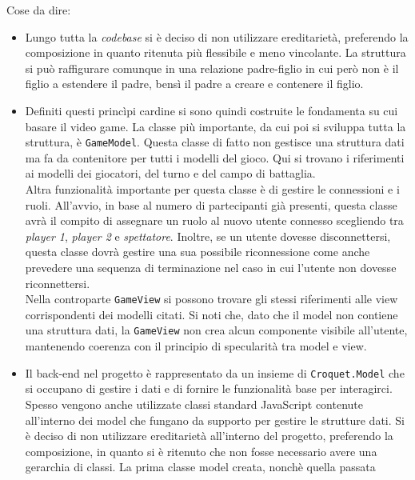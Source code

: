 Cose da dire:
\begin{itemize}
\item Lungo tutta la \textit{codebase} si è deciso di non utilizzare ereditarietà, preferendo la composizione in quanto ritenuta più flessibile e meno vincolante. La struttura si può
raffigurare comunque in una relazione padre-figlio in cui però non è il figlio a estendere il padre, bensì il padre a creare e contenere il figlio.\\

\item Definiti questi princìpi cardine si sono quindi costruite le fondamenta su cui basare il video game. La classe più importante, da cui poi si sviluppa tutta la struttura, è 
\texttt{GameModel}. Questa classe di fatto non gestisce una struttura dati ma fa da contenitore per tutti i modelli del gioco. Qui si trovano i riferimenti ai modelli dei giocatori,
del turno e del campo di battaglia.\\
Altra funzionalità importante per questa classe è di gestire le connessioni e i ruoli. All'avvio, in base al numero di partecipanti già presenti, questa classe avrà il compito di 
assegnare un ruolo al nuovo utente connesso scegliendo tra \textit{player 1}, \textit{player 2} e \textit{spettatore}. Inoltre, se un utente dovesse disconnettersi, questa classe
dovrà gestire una sua possibile riconnessione come anche prevedere una sequenza di terminazione nel caso in cui l'utente non dovesse riconnettersi.\\
Nella controparte \texttt{GameView} si possono trovare gli stessi riferimenti alle view corrispondenti dei modelli citati. Si noti che, dato che il model non contiene una struttura
dati, la \texttt{GameView} non crea alcun componente visibile all'utente, mantenendo coerenza con il principio di specularità tra model e view.\\

\item Il back-end nel progetto è rappresentato da un insieme di \texttt{Croquet.Model} che si occupano di gestire i dati e di fornire le funzionalità base per interagirci. Spesso vengono
anche utilizzate classi standard JavaScript contenute all'interno dei model che fungano da supporto per gestire le strutture dati. Si è deciso di non utilizzare ereditarietà 
all'interno del progetto, preferendo la composizione, in quanto si è ritenuto che non fosse necessario avere una gerarchia di classi. 
La prima classe model creata, nonchè quella passata 
\end{itemize}